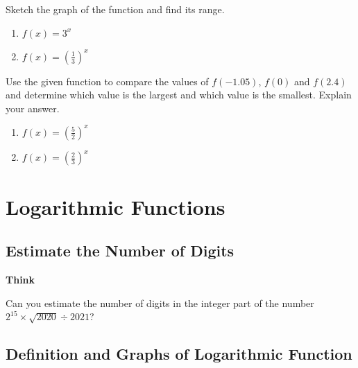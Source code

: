 \documentclass[en,12pt]{elegantbook}
\providecommand{\tightlist}{%
  \setlength{\itemsep}{0pt}\setlength{\parskip}{0pt}}
\newenvironment{rmdthink}{
	\par\noindent
	{
		\makebox[-\width][r]{
			\footnotesize
			\color{green!90}\faLightbulbO
			\hspace*{3pt}
		}
			\textbf{
				\color{second}
				Think 
			}
    }
    \begin{shaded}
    \sffamily
}{
    \par\medskip\ignorespacesafterend
    \end{shaded}
}
\providecommand{\tightlist}{%
  \setlength{\itemsep}{0pt}\setlength{\parskip}{0pt}}
\let\BeginKnitrBlock\begin \let\EndKnitrBlock\end
\begin{document}
\BeginKnitrBlock{exercise}
\protect\hypertarget{exr:unnamed-chunk-283}{}{\label{exr:unnamed-chunk-283} }
Sketch the graph of the function and find its range.

\begin{enumerate}
\def\labelenumi{\arabic{enumi}.}
\tightlist
\item
  \(f(x)=3^x\)
\item
  \(f(x)=\left(\frac13\right)^x\)
\end{enumerate}
\EndKnitrBlock{exercise}

\BeginKnitrBlock{exercise}
\protect\hypertarget{exr:unnamed-chunk-284}{}{\label{exr:unnamed-chunk-284} }
Use the given function to compare the values of \(f(-1.05)\), \(f(0)\) and \(f(2.4)\) and determine which value is the largest and which value is the smallest. Explain your answer.

\begin{enumerate}
\def\labelenumi{\arabic{enumi}.}
\tightlist
\item
  \(f(x)=\left(\frac{5}{2}\right)^x\)
\item
  \(f(x)=\left(\frac23\right)^x\)
\end{enumerate}
\EndKnitrBlock{exercise}

\hypertarget{logarithmic-functions}{%
\chapter{Logarithmic Functions}\label{logarithmic-functions}}

\hypertarget{estimate-the-number-of-digits}{%
\section{Estimate the Number of Digits}\label{estimate-the-number-of-digits}}

\begin{rmdthink}

Can you estimate the number of digits in the integer part of the number \(2^{15}\times \sqrt{2020}\div 2021\)?

\end{rmdthink}

\hypertarget{definition-and-graphs-of-logarithmic-function}{%
\section{Definition and Graphs of Logarithmic Function}\label{definition-and-graphs-of-logarithmic-function}}
\end{document}
